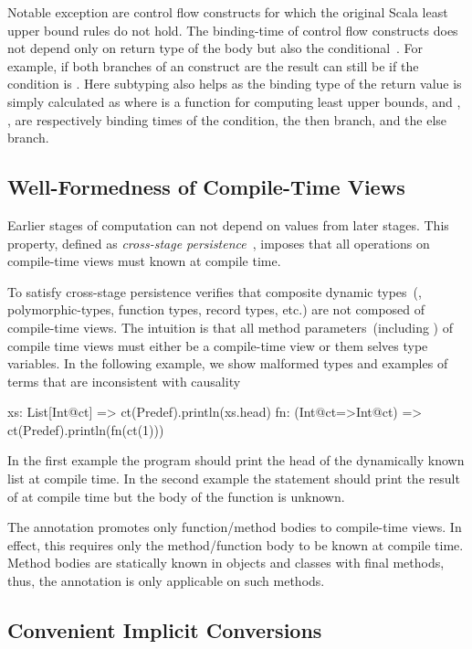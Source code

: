  Notable exception are control flow constructs for which the original Scala least
 upper bound rules do not hold. The binding-time of control flow constructs does not
 depend only on return type of the body but also the conditional~\cite{}. For example, if
 both branches of an  construct are  the result can still be 
 if the condition is . Here subtyping also helps as the binding type of the
 return value is simply calculated as  where  is a function
 for computing least upper bounds, and , ,  are respectively
 binding times of the condition, the then branch, and the else branch.

\subsection{Well-Formedness of Compile-Time Views}
\label{sct:wf-ctv}

Earlier stages of computation can not depend on values from later stages. This property,
 defined as \emph{cross-stage persistence}~\cite{taha_multi-stage_1997,westbrook2010mint},
 imposes that all operations on compile-time views must known at compile time.

To satisfy cross-stage persistence \tool verifies that composite dynamic
 types~(\eg, polymorphic-types, function types, record types, etc.) are not composed
 of compile-time views. The intuition is that all method parameters~(including )
 of compile time views must either be a compile-time view or them selves type variables. In the following example,
 we show malformed types and examples of terms that are inconsistent with causality\begin{lstparagraph}
xs: List[Int@ct]     => ct(Predef).println(xs.head)
fn: (Int@ct=>Int@ct) => ct(Predef).println(fn(ct(1)))
\end{lstparagraph}

In the first example the program should print the head of the dynamically known list
 at compile time. In the second example the statement should print the result of  at
 compile time but the body of the function is unknown.

The  annotation promotes only function/method bodies to compile-time views. In effect,
 this requires only the method/function body to be known at compile time. Method bodies
 are statically known in objects and classes with final methods, thus, the 
 annotation is only applicable on such methods.


\subsection{Convenient Implicit Conversions}
\label{sct:implicits}
